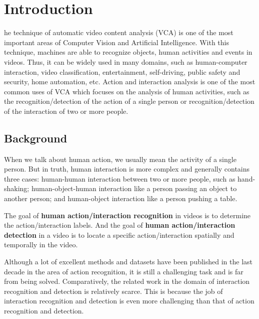 %
%
\let\textcircled=\pgftextcircled
\chapter{Introduction}
\label{chap:intro}

he technique of automatic video content analysis (VCA) is one of the most important areas of Computer Vision and Artificial Intelligence. With this technique, machines are able to recognize objects, human activities and events in videos.   Thus, it can be widely used in many domains, such as human-computer interaction, video classification, entertainment, self-driving, public safety and security, home automation, etc. Action and interaction analysis is one of the most common uses of VCA which focuses on the analysis of human activities, such as the  recognition/detection of the action of a single person or recognition/detection of the interaction of two or more people.


\section{Background}
\label{sec:intro_sec01}
When we talk about human action, we usually mean the activity of a single person. But in truth, human interaction is more complex and generally contains three cases: human-human interaction between two or more people, such as hand-shaking; human-object-human interaction like a person passing an object to another person; and human-object interaction like a person pushing a table.
\par 
The goal of \textbf{human action/interaction recognition} in videos is to determine the action/interaction labels. And the goal of \textbf{human action/interaction detection} in a video is to locate a specific action/interaction spatially and temporally in the video. 
\par 
Although a lot of excellent methods and datasets have been published in the last decade in the area of action recognition, it is still a challenging task and is far from being solved. Comparatively, the related work in the domain of interaction recognition and detection is relatively scarce. This is because the job of interaction recognition and detection is even more challenging than that of action recognition and detection.  
 
